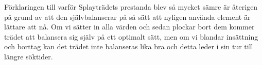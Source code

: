 \documentclass[a4paper,10pt,oneside]{article}
\begin{document}
Förklaringen till varför Splayträdets prestanda blev så mycket sämre är återigen på grund av att den självbalanserar på så sätt att nyligen använda element är lättare att nå. Om vi sätter in alla värden och sedan plockar bort dem kommer trädet att balansera sig själv på ett optimalt sätt, men om vi blandar insättning och borttag kan det trädet inte balanseras lika bra och detta leder i sin tur till längre söktider.
	
\end{document}

